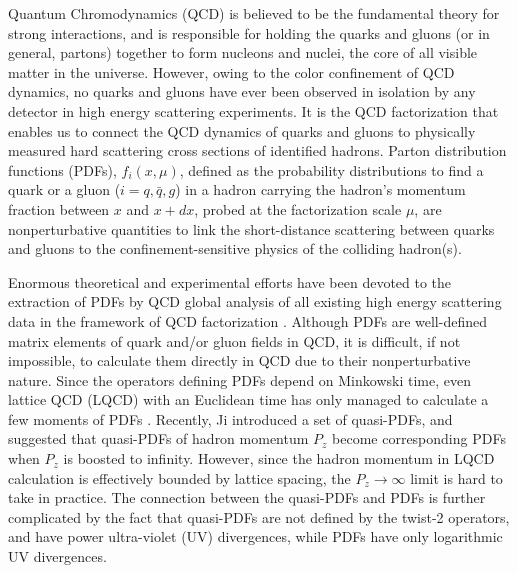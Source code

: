 \documentclass[twocolumn,aps,prl,superscriptaddress,nofootinbib,showpacs]{revtex4-1}
\newcommand{\sect}[1]{\noindent{\it \textbf{#1} ---}}
\begin{document}
\sect{Introduction}
Quantum Chromodynamics (QCD) is believed to be the fundamental theory for strong interactions, and is responsible for holding the quarks and gluons (or in general, partons) together to form nucleons and nuclei, the core of all visible matter in the universe. However, owing to the color confinement of QCD dynamics, no quarks and gluons have ever been observed in isolation by any detector in high energy scattering experiments.  It is the QCD factorization \cite{Collins:1989gx} that enables us to connect the QCD dynamics of quarks and gluons to physically measured hard scattering cross sections of identified hadrons.  Parton distribution functions (PDFs), $f_{i}(x,\mu)$, defined as the probability distributions to find a quark or a gluon ($i=q,\bar{q},g$) in a hadron carrying the hadron's momentum fraction between $x$ and $x+dx$, probed at the factorization scale $\mu$, are nonperturbative quantities to link the short-distance scattering between quarks and gluons to the confinement-sensitive physics of the colliding hadron(s).

Enormous theoretical and experimental efforts have been devoted to the extraction of PDFs by QCD global analysis of all existing high energy scattering data in the framework of QCD factorization \cite{Gao:2013xoa,Martin:2009iq,Ball:2011mu,Alekhin:2013nda}.  Although PDFs are well-defined matrix elements of quark and/or gluon fields in QCD, it is difficult, if not impossible, to calculate them directly in QCD due to their nonperturbative nature.  Since the operators defining PDFs depend on Minkowski time, even lattice QCD (LQCD) with an Euclidean time has only managed to calculate a few moments of PDFs \cite{Dolgov:2002zm,Gockeler:2004wp}.  Recently, Ji \cite{Ji:2013dva} introduced a set of quasi-PDFs,
and suggested that quasi-PDFs of hadron momentum $P_z$ become corresponding PDFs when $P_z$ is boosted to infinity.  However, since the hadron momentum in LQCD calculation is effectively bounded by lattice spacing, the $P_z\to\infty$ limit is hard to take in practice.  The connection between the quasi-PDFs and PDFs is further complicated by the fact that quasi-PDFs are not defined by the twist-2 operators, and have power ultra-violet (UV) divergences, while PDFs have only logarithmic UV divergences.
\end{document}
